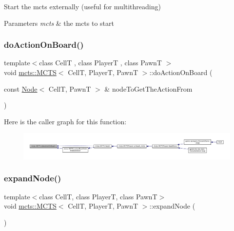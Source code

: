 Start the mcts externally (useful for multithreading) 


\begin{DoxyParams}{Parameters}
{\em mcts} & the mcts to start \\
\hline
\end{DoxyParams}
\mbox{\label{classmcts_1_1_m_c_t_s_a9b161c003bc21fe3910d7800c09fff1d}} 
\subsubsection{\texorpdfstring{do\+Action\+On\+Board()}{doActionOnBoard()}}
{\footnotesize\ttfamily template$<$class CellT , class PlayerT , class PawnT $>$ \\
void \hyperlink{classmcts_1_1_m_c_t_s}{mcts\+::\+M\+C\+TS}$<$ CellT, PlayerT, PawnT $>$\+::do\+Action\+On\+Board (\begin{DoxyParamCaption}\item[{const \hyperlink{structmcts_1_1_node}{Node}$<$ CellT, PawnT $>$ \&}]{node\+To\+Get\+The\+Action\+From }\end{DoxyParamCaption})\hspace{0.3cm}{\ttfamily [protected]}}

Here is the caller graph for this function\+:
\nopagebreak
\begin{figure}[H]
\begin{center}
\leavevmode
\includegraphics[width=350pt]{classmcts_1_1_m_c_t_s_a9b161c003bc21fe3910d7800c09fff1d_icgraph}
\end{center}
\end{figure}
\mbox{\label{classmcts_1_1_m_c_t_s_a8c65e74d070a037e5ad0331a39379c9c}} 
\subsubsection{\texorpdfstring{expand\+Node()}{expandNode()}\hspace{0.1cm}{\footnotesize\ttfamily [1/2]}}
{\footnotesize\ttfamily template$<$class CellT, class PlayerT, class PawnT$>$ \\
void \hyperlink{classmcts_1_1_m_c_t_s}{mcts\+::\+M\+C\+TS}$<$ CellT, PlayerT, PawnT $>$\+::expand\+Node (\begin{DoxyParamCaption}{ }\end{DoxyParamCaption})\hspace{0.3cm}{\ttfamily [protected]}}

